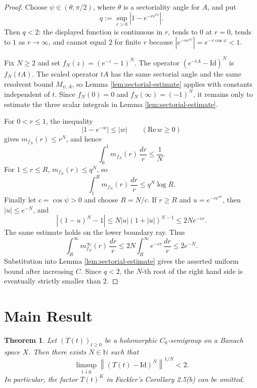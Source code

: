 \documentclass[11pt]{article}
\newtheorem{theorem}{Theorem}
\newcommand{\N}{\mathbb{N}}
\newcommand{\Id}{\mathrm{Id}}
\newcommand{\norm}[1]{\left\lVert #1 \right\rVert}
\newcommand{\abs}[1]{\left\lvert #1 \right\rvert}
\begin{document}
\begin{proof}
Choose \(\psi\in(\theta,\pi/2)\), where \(\theta\) is a sectoriality angle for
\(A\), and put
\[
  q:=\sup_{r>0}\abs{1-e^{-re^{i\psi}}}.
\]
Then \(q<2\): the displayed function is continuous in \(r\), tends to \(0\) at
\(r=0\), tends to \(1\) as \(r\to\infty\), and cannot equal \(2\) for finite
\(r\) because \(\abs{e^{-re^{i\psi}}}=e^{-r\cos\psi}<1\).

Fix \(N\ge2\) and set \(f_N(z)=(e^{-z}-1)^N\).  The operator
\((e^{-tA}-\Id)^N\) is \(f_N(tA)\).  The scaled operator \(tA\) has the same
sectorial angle and the same resolvent bound \(M_{\psi,A}\), so Lemma
\ref{lem:sectorial-estimate} applies with constants independent of \(t\).
Since \(f_N(0)=0\) and \(f_N(\infty)=(-1)^N\), it remains only to estimate the
three scalar integrals in Lemma \ref{lem:sectorial-estimate}.

For \(0<r\le1\), the inequality
\[
  \abs{1-e^{-w}}\le \abs{w}\qquad(\mathrm{Re}\,w\ge0)
\]
gives \(m_{f_N}(r)\le r^N\), and hence
\[
  \int_0^1 m_{f_N}(r)\,\frac{dr}{r}\le \frac1N.
\]
For \(1\le r\le R\), \(m_{f_N}(r)\le q^N\), so
\[
  \int_1^R m_{f_N}(r)\,\frac{dr}{r}\le q^N\log R.
\]
Finally let \(c=\cos\psi>0\) and choose \(R=N/c\).  If \(r\ge R\) and
\(u=e^{-re^{i\psi}}\), then \(\abs{u}\le e^{-N}\), and
\[
  \abs{(1-u)^N-1}
  \le N\abs{u}(1+\abs{u})^{N-1}
  \le 2N e^{-cr}.
\]
The same estimate holds on the lower boundary ray.  Thus
\[
  \int_R^\infty m_{f_N}^\infty(r)\,\frac{dr}{r}
  \le 2N\int_R^\infty e^{-cr}\,\frac{dr}{r}
  \le 2e^{-N}.
\]
Substitution into Lemma \ref{lem:sectorial-estimate} gives the asserted
uniform bound after increasing \(C\).  Since \(q<2\), the \(N\)-th root of the
right hand side is eventually strictly smaller than \(2\).
\end{proof}

\section*{Main Result}

\begin{theorem}
\label{thm:main}
Let \((T(t))_{t\ge0}\) be a holomorphic \(C_0\)-semigroup on a Banach space
\(X\).  Then there exists \(N\in\N\) such that
\[
  \limsup_{t\downarrow0}
  \norm{(T(t)-\Id)^N}^{1/N}<2.
\]
In particular, the factor \(T(t)^K\) in Fackler's Corollary 2.5(b) can be
omitted.
\end{theorem}
\end{document}
